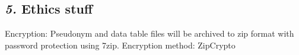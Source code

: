 \documentclass[12pt, english]{article}
\begin{document}

\subsection*{\emph{5.} Ethics stuff}

Encryption: Pseudonym and data table files will be archived to zip format with password protection using 7zip. Encryption method: ZipCrypto  


\end{document}
